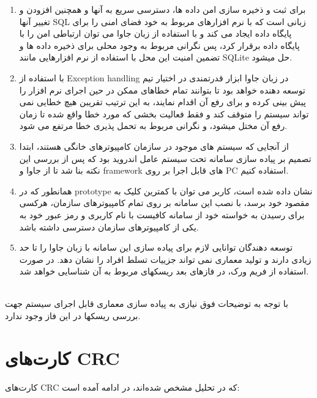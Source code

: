 \documentclass{article}
\begin{document}
\begin{enumerate}
\item برای ثبت و ذخیره سازی امن داده ها، دسترسی سریع به آنها و همچنین افزودن و تغییر آنها SQL زبانی است که با نرم افزارهای مربوط به خود فضای امنی را برای پایگاه داده ایجاد می کند و با استفاده از زبان جاوا می توان ارتباطی امن را با پایگاه داده برقرار کرد، پس نگرانی مربوط به وجود محلی برای ذخیره داده ها و تضمین امنیت این محل با استفاده از نرم افزارهایی مانند SQLite حل میشود.

\item با استفاده از Exception handling در زبان جاوا ابزار قدرتمندی در اختیار تیم توسعه دهنده خواهد بود تا بتوانند تمام خطاهای ممکن در حین اجرای نرم افزار را پیش بینی کرده و برای رفع آن اقدام نمایند، به این ترتیب تقریبن هیچ خطایی نمی تواند سیستم را متوقف کند و فقط فعالیت بخشی که مورد خطا واقع شده تا زمان رفع آن مختل میشود، و نگرانی مربوط به تحمل پذیری خطا مرتفع می شود.

\item از آنجایی که سیستم های موجود در سازمان کامپیوترهای خانگی هستند، ابتدا تصمیم بر پیاده سازی سامانه تحت سیستم عامل اندروید بود که پس از بررسی این نکته بنا شد تا از جاوا و framework های قابل اجرا بر روی PC استفاده کنیم.

\item همانطور که در prototype نشان داده شده است، کاربر می توان با کمترین کلیک به مقصود خود برسد، با نصب این سامانه بر روی تمام کامپیوترهای سازمان، هرکسی برای رسیدن به خواسته خود از سامانه کافیست با نام کاربری و رمز عبور خود به یکی از کامپیوترهای سازمان دسترسی داشته باشد.

\item توسعه دهندگان توانایی لازم برای پیاده سازی این سامانه با زبان جاوا را تا حد زیادی دارند و تولید معماری نمی تواند جزییات تسلط افراد را نشان دهد. در صورت استفاده از فریم ورک، در فازهای بعد ریسکهای مربوط به آن شناسایی خواهد شد.
\end{enumerate}
\\

با توجه به توضیحات فوق نیازی به پیاده سازی معماری قابل اجرای سیستم جهت بررسی ریسکها در این فاز وجود ندارد.


\newpage
\section{کارت‌های CRC}

کارت‌های CRC که در تحلیل مشخص شده‌اند، در ادامه آمده است:
\end{document}
